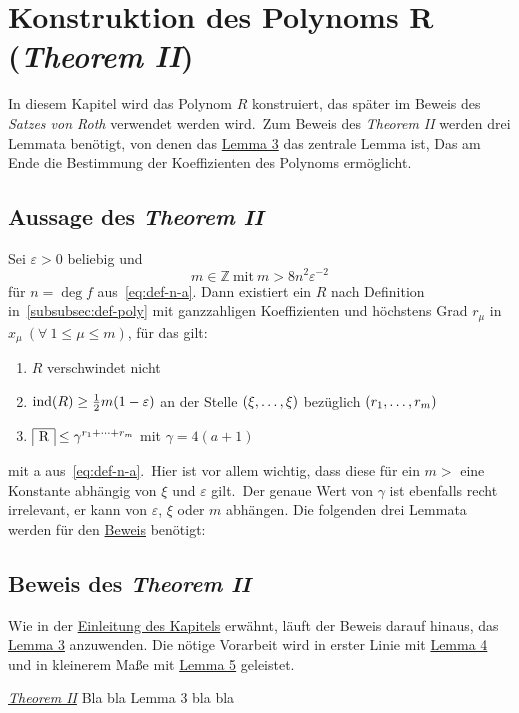 
\section{Konstruktion des Polynoms R (\emph{Theorem II})}
    \label{sec:th2}
    \textrm{In diesem Kapitel wird das Polynom $R$ konstruiert, das später im Beweis des \emph{Satzes von Roth}
    verwendet werden wird.\ Zum Beweis des \emph{Theorem II} werden drei Lemmata benötigt, von denen das \hyperref
    [subsec:lemma3]{Lemma 3} das zentrale Lemma ist, Das am Ende die Bestimmung der Koeffizienten des Polynoms
    ermöglicht.}
    
    \subsection{Aussage des \emph{Theorem II}}
        \label{subsec:th2}
        Sei $\varepsilon > 0$ beliebig und
        \begin{equation}
            m \in \mathbb{Z} \  \text{mit} \  m > 8 n^2 \varepsilon^{-2} \label{eq:def-m}
        \end{equation}
        \textrm{für $n = \deg f$ aus~\eqref{eq:def-n-a}.
        Dann existiert ein $R$ nach Definition in~\ref{subsubsec:def-poly} mit ganzzahligen Koeffizienten und höchstens
        Grad $r_\mu$ in $x_\mu \ (\forall \ 1 \leq \mu \leq m)$, für das gilt:}
        \begin{enumerate}
            \item $R$ verschwindet nicht
            \item \textrm{$\operatorname{ind}(R) \geq \frac{1}{2} m (1 - \varepsilon)$ an der Stelle $(\xi, \dots, \xi)$ bezüglich
                $(r_1, \dots, r_m)$}
            \item $\content{R} \leq \gamma^{\dsum{r_1}{r_m}}$ mit $\gamma = 4 (a + 1)$
        \end{enumerate}
        \textrm{mit a aus~\eqref{eq:def-n-a}.\ Hier ist vor allem wichtig, dass diese für ein $m >$ eine Konstante
        abhängig von $\xi$ und $\varepsilon$ gilt.\ Der genaue Wert von $\gamma$ ist ebenfalls recht irrelevant, er
        kann von $\varepsilon$, $\xi$ oder $m$ abhängen.}
        \newline \newline
        \textrm{Die folgenden drei Lemmata werden für den \hyperref[subsec:proof-th2]{Beweis} benötigt:}
    
    
    
    \subsection{Beweis des \emph{Theorem II}}
        \label{subsec:proof-th2}
        \textrm{Wie in der \hyperref[sec:th2]{Einleitung des Kapitels} erwähnt, läuft der Beweis darauf hinaus, das \hyperref
        [subsec:lemma3]{Lemma 3} anzuwenden. Die nötige Vorarbeit wird in erster Linie mit \hyperref[subsec:lemma4]{Lemma 4} und
        in kleinerem Maße mit \hyperref[subsec:lemma5]{Lemma 5} geleistet.}
        \begin{proofname}{\emph{\hyperref[subsec:th2]{Theorem II}}}
            Bla bla Lemma 3 bla bla
        \end{proofname}
    
